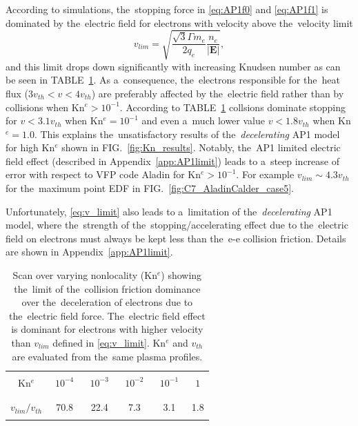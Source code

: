\documentclass[
 aps,
 jmp,
 amsmath,amssymb,
 twocolumn,
]{revtex4-1}
\newcommand{\figref}[1]{FIG.~\ref{#1}}
\newcommand{\appref}[1]{Appendix~\ref{#1}}
\newcommand{\tabref}[1]{TABLE~\ref{#1}}
\newcommand{\vect}[1]{\boldsymbol{#1}}
\newcommand{\nue}{\nu_{e}}
\newcommand{\vmag}{v}
\newcommand{\vth}{v_{th}}
\newcommand{\E}{\vect{E}}
\newcommand{\qe}{q_e}
\newcommand{\me}{m_e}
\begin{document}
According to simulations,
the~stopping force in \eqref{eq:AP1f0} and \eqref{eq:AP1f1} is dominated by
the~electric field for electrons with velocity above the~velocity limit
\begin{equation}
  \vmag_{lim} = \sqrt{\frac{\sqrt{3}\Gamma\me}{2\qe}\frac{n_e}{|\E|}}
  ,
  \label{eq:v_limit}
\end{equation}
and this limit drops 
down significantly with increasing Knudsen number as can be seen 
in \tabref{tab:vlim}. 
As a~consequence, the~electrons responsible for the~heat flux
($3 \vth < \vmag <4 \vth$) are preferably affected by the~electric field
rather than by collisions when Kn$^{e} > 10^{-1}$. According to 
\tabref{tab:vlim} collsions dominate stopping for $\vmag < 3.1 \vth$ 
when Kn$^e = 10^{-1}$ and even a~much lower value $\vmag < 1.8 \vth$ 
when Kn$^e = 1.0$. This explains the~unsatisfactory results of 
the~\textit{decelerating} AP1
model for high Kn$^e$ shown in \figref{fig:Kn_results}. 
Notably, the~AP1 limited electric field effect (described in 
\appref{app:AP1limit}) leads to a~steep increase of error with respect 
to VFP code Aladin for Kn$^e > 10^{-1}$. 
For example $\vmag_{lim}\sim 4.3\vth$ for the~maximum point EDF in 
\figref{fig:C7_AladinCalder_case5}.

Unfortunately, \eqref{eq:v_limit} also leads to a~limitation of 
the~\textit{decelerating} AP1 model, where the~strength of the~stopping/accelerating effect due to the~electric field on electrons must always 
be kept less than the~e-e collision friction. Details are shown 
in \appref{app:AP1limit}.

\begin{table}
\begin{center}
  \begin{tabular}{c|ccccc}
    \hline\hline\\
    Kn$^e$ & $\,\,10^{-4}\,\,$ & $\,\,10^{-3}\,\,$ & $\,\,10^{-2}\,\,$ & $\,\,10^{-1}\,\,$ & $\,\,1\,\,$ \\\\
    \hline\\
    $\vmag_{lim} / \vth$ & 70.8 & 22.4 & 7.3 & 3.1 & 1.8\\\\
    \hline\hline
  \end{tabular}
  \caption{
  Scan over varying nonlocality (Kn$^e$) showing the~limit of 
  the~collision friction dominance over the~deceleration of electrons 
  due to the~electric field force. The~electric field effect is dominant
  for electrons with higher velocity than $\vmag_{lim}$ defined in 
  \eqref{eq:v_limit}. Kn$^e$ and $\vth$ are evaluated from the~same 
  plasma profiles.
  }
\label{tab:vlim}
\end{center}
\end{table}
\end{document}
